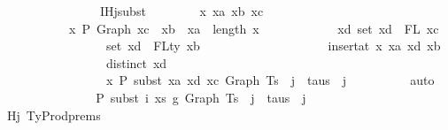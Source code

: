 \begin{isabellebody}
\isanewline
\ \ \ \ \ \ \isanewline
\ \ \ \ \ \ \isamarkupfalse%
\ \isamarkupfalse%
\ IHj{\isacharunderscore}{\kern0pt}subst{\isacharcolon}{\kern0pt}\isanewline
\ \ \ \ \ \ \ \ {\isachardoublequoteopen}{\isasymforall}x\ xa\ xb\ xc{\isachardot}{\kern0pt}\isanewline
\ \ \ \ \ \ \ \ \ \ \ x\ {\isasymturnstile}{\isacharbraceleft}{\kern0pt}P{\isacharbraceright}{\kern0pt}\ Graph\ xc\ {\isacharcolon}{\kern0pt}\ xb\ {\isasymlongrightarrow}\ xa\ {\isasymle}\ length\ x\ {\isasymlongrightarrow}\isanewline
\ \ \ \ \ \ \ \ \ \ \ {\isacharparenleft}{\kern0pt}{\isasymforall}xd{\isachardot}{\kern0pt}\ set\ xd\ {\isacharequal}{\kern0pt}\ FL\ xc\ {\isasymlongrightarrow}\isanewline
\ \ \ \ \ \ \ \ \ \ \ \ \ \ \ \ \ set\ xd\ {\isacharequal}{\kern0pt}\ FLty\ xb\ {\isasymlongrightarrow}\isanewline
\ \ \ \ \ \ \ \ \ \ \ \ \ \ \ \ \ {\isasymGamma}\ {\isacharequal}{\kern0pt}\ insert{\isacharunderscore}{\kern0pt}at\ x\ xa\ {\isacharparenleft}{\kern0pt}xd{\isacharcomma}{\kern0pt}\ xb{\isacharparenright}{\kern0pt}\ {\isasymlongrightarrow}\isanewline
\ \ \ \ \ \ \ \ \ \ \ \ \ \ \ \ \ distinct\ xd\ {\isasymlongrightarrow}\isanewline
\ \ \ \ \ \ \ \ \ \ \ \ \ \ \ \ \ x\ {\isasymturnstile}{\isacharbraceleft}{\kern0pt}P{\isacharbraceright}{\kern0pt}\ subst\ xa\ xd\ xc\ {\isacharparenleft}{\kern0pt}Graph\ {\isacharparenleft}{\kern0pt}Ts\ {\isacharbang}{\kern0pt}\ j{\isacharparenright}{\kern0pt}{\isacharparenright}{\kern0pt}\ {\isacharcolon}{\kern0pt}\ taus\ {\isacharbang}{\kern0pt}\ j{\isacharparenright}{\kern0pt}{\isachardoublequoteclose}\isanewline
\ \ \ \ \ \ \ \ \isamarkupfalse%
\ auto\isanewline
\isanewline
\ \ \ \ \ \ \isanewline
\ \ \ \ \ \ \isamarkupfalse%
\ {\isachardoublequoteopen}{\isasymGamma}{}\ {\isasymturnstile}{\isacharbraceleft}{\kern0pt}P{\isacharbraceright}{\kern0pt}\ subst\ i\ xs\ g{}\ {\isacharparenleft}{\kern0pt}Graph\ {\isacharparenleft}{\kern0pt}Ts\ {\isacharbang}{\kern0pt}\ j{\isacharparenright}{\kern0pt}{\isacharparenright}{\kern0pt}\ {\isacharcolon}{\kern0pt}\ taus\ {\isacharbang}{\kern0pt}\ j{\isachardoublequoteclose}\isanewline
\ \ \ \ \ \ \ \ \ \isamarkupfalse%
\ Hj\ TyProd{\isachardot}{\kern0pt}prems{\isacharparenleft}{\kern0pt}{}{\isacharcomma}{\kern0pt}{}{\isacharcomma}{\kern0pt}{}{\isacharcomma}{\kern0pt}{}{\isacharcomma}{\kern0pt}{}{\isacharparenright}{\kern0pt}\isanewline

\end{isabellebody}
